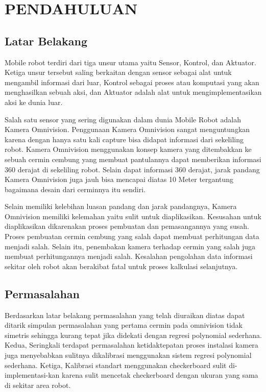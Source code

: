 \chapter{PENDAHULUAN}
\label{chap:pendahuluan}


\section{Latar Belakang}
\label{sec:latarbelakang}


Mobile robot terdiri dari tiga unsur utama yaitu Sensor, Kontrol, dan Aktuator. Ketiga unsur tersebut saling berkaitan dengan sensor sebagai alat untuk mengambil informasi dari luar, Kontrol sebagai proses atau komputasi yang akan menghasilkan sebuah aksi, dan Aktuator adalah alat untuk mengimplementasikan aksi ke dunia luar. 

Salah satu sensor yang sering digunakan dalam dunia Mobile Robot adalah Kamera Omnivision. Penggunaan Kamera Omnivision sangat menguntungkan karena dengan hanya satu kali capture bisa didapat informasi dari sekeliling robot. Kamera Omnivision menggunakan konsep kamera yang ditembakkan ke sebuah cermin cembung yang membuat pantulannya dapat memberikan informasi 360 derajat di sekeliling robot. Selain dapat informasi 360 derajat, jarak pandang Kamera Omnivision juga jauh bisa mencapai diatas 10 Meter tergantung bagaimana desain dari cerminnya itu sendiri. 

Selain memiliki kelebihan luasan pandang dan jarak pandangnya, Kamera Omnivision memiliki kelemahan yaitu sulit untuk diaplikasikan. Kesusahan untuk diaplikasikan dikarenakan proses pembuatan dan pemasangannya yang susah. Proses pembuatan cermin cembung yang salah dapat membuat perhitungan data menjadi salah. Selain itu, penembakan kamera terhadap cermin yang salah juga membuat perhitungannya menjadi salah. Kesalahan pengolahan data informasi sekitar oleh robot akan berakibat fatal untuk proses kalkulasi selanjutnya. 


\lipsum[2]

\section{Permasalahan}
\label{sec:permasalahan}

Berdasarkan latar belakang permasalahan yang telah diuraikan diatas dapat ditarik simpulan permasalahan yang pertama cermin pada omnivision tidak simetris sehingga kurang tepat jika didekati dengan regresi polynomial sederhana. Kedua, Seringkali terdapat permasalahan ketidaktepatan proses instalasi kamera juga menyebabkan sulitnya dikalibrasi menggunakan sistem regresi polynomial sederhana. Ketiga, Kalibrasi standart menggunakan checkerboard sulit di-implementasi-kan karena sulit mencetak checkerboard dengan ukuran yang sama di sekitar area robot. 


